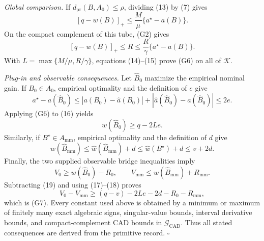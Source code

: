 \emph{Global comparison.}
If \(d_{\mathrm{pr}}(B,A_0)\le\rho\), dividing (13) by (7) gives
\[
[q-w(B)]_+\le\frac M\mu\{a^\star-a(B)\}.
\tag{14}
\]
On the compact complement of this tube, (G2) gives
\[
[q-w(B)]_+\le R
\le\frac R\gamma\{a^\star-a(B)\}.
\tag{15}
\]
With \(L=\max\{M/\mu,R/\gamma\}\), equations (14)--(15) prove (G6) on all of \(\mathcal K\).

\emph{Plug-in and observable consequences.}
Let \(\widehat B_0\) maximize the empirical nominal gain.  If \(B_0\in A_0\), empirical optimality and the definition of \(e\) give
\[
a^\star-a(\widehat B_0)
\le |a(B_0)-\widehat a(B_0)|
+|\widehat a(\widehat B_0)-a(\widehat B_0)|
\le2e.
\tag{16}
\]
Applying (G6) to (16) yields
\[
w(\widehat B_0)\ge q-2Le.
\tag{17}
\]
Similarly, if \(B^\star\in A_{\mathrm{mm}}\), empirical optimality and the definition of \(d\) give
\[
w(\widehat B_{\mathrm{mm}})
\le\widehat w(\widehat B_{\mathrm{mm}})+d
\le\widehat w(B^\star)+d
\le v+2d.
\tag{18}
\]
Finally, the two supplied observable bridge inequalities imply
\[
V_0\ge w(\widehat B_0)-R_0,
\qquad
V_{\mathrm{mm}}\le w(\widehat B_{\mathrm{mm}})+R_{\mathrm{mm}}.
\tag{19}
\]
Subtracting (19) and using (17)--(18) proves
\[
V_0-V_{\mathrm{mm}}
\ge(q-v)-2Le-2d-R_0-R_{\mathrm{mm}},
\]
which is (G7).  Every constant used above is obtained by a minimum or maximum of finitely many exact algebraic signs, singular-value bounds, interval derivative bounds, and compact-complement CAD bounds in \(\mathscr G_{\mathrm{CAD}}\).  Thus all stated consequences are derived from the primitive record. \(\square\)